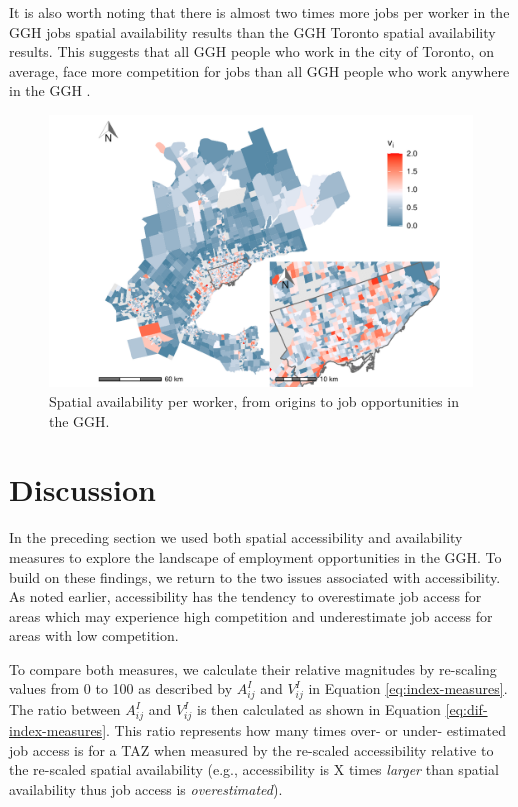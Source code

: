 \documentclass[]{elsarticle} %
\begin{document}
It is also worth noting that there is almost two times more jobs per
worker in the GGH jobs spatial availability results than the GGH Toronto
spatial availability results. This suggests that all GGH people who work
in the city of Toronto, on average, face more competition for jobs than
all GGH people who work anywhere in the GGH .

\begin{figure}
\includegraphics[width=1\linewidth]{Spatial-Availability_files/figure-latex/plot-avail-GGH-TTS-per-worker-1} \caption{\label{fig:plot-avail-GGH-TTS-per-worker}Spatial availability per worker, from origins to job opportunities in the GGH.}\label{fig:plot-avail-GGH-TTS-per-worker}
\end{figure}

\newpage

\hypertarget{discussion}{%
\section{Discussion}\label{discussion}}

In the preceding section we used both spatial accessibility and
availability measures to explore the landscape of employment
opportunities in the GGH. To build on these findings, we return to the
two issues associated with accessibility. As noted earlier,
accessibility has the tendency to overestimate job access for areas
which may experience high competition and underestimate job access for
areas with low competition.

To compare both measures, we calculate their relative magnitudes by
re-scaling values from 0 to 100 as described by \(A^I_{ij}\) and
\(V^I_{ij}\) in Equation \ref{eq:index-measures}. The ratio between
\(A^I_{ij}\) and \(V^I_{ij}\) is then calculated as shown in Equation
\ref{eq:dif-index-measures}. This ratio represents how many times over-
or under- estimated job access is for a TAZ when measured by the
re-scaled accessibility relative to the re-scaled spatial availability
(e.g., accessibility is X times \emph{larger} than spatial availability
thus job access is \emph{overestimated}).
\end{document}
